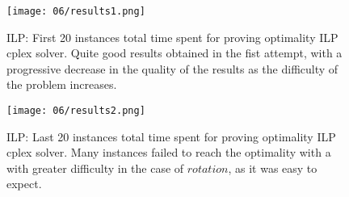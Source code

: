     \begin{figure}[H]
      \centering
      \texttt{[image: 06/results1.png]}
      \caption{ILP: 
        First 20 instances total time spent for proving optimality ILP cplex solver. Quite good 
        results obtained in the fist attempt, with a progressive decrease in the quality of the 
        results as the difficulty of the problem increases.
      }
      \label{fig:ILP_results1}
    \end{figure}
    \begin{figure}[H]
      \centering
      \texttt{[image: 06/results2.png]}
      \caption{ILP: 
        Last 20 instances total time spent for proving optimality ILP cplex solver. Many 
        instances failed to reach the optimality with a with greater difficulty in the case of 
        \(rotation\), as it was easy to expect.
      }
      \label{fig:ILP_results2}
    \end{figure}
